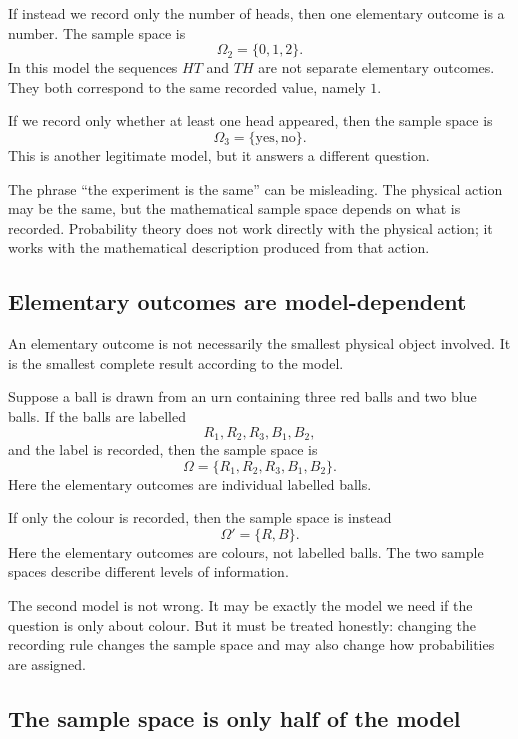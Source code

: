 If instead we record only the number of heads, then one elementary outcome is a
number. The sample space is
\[
\Omega_2=\{0,1,2\}.
\]
In this model the sequences \(HT\) and \(TH\) are not separate elementary
outcomes. They both correspond to the same recorded value, namely \(1\).

If we record only whether at least one head appeared, then the sample space is
\[
\Omega_3=\{\text{yes},\text{no}\}.
\]
This is another legitimate model, but it answers a different question.

\begin{remarkbox}
The phrase ``the experiment is the same'' can be misleading. The physical action
may be the same, but the mathematical sample space depends on what is recorded.
Probability theory does not work directly with the physical action; it works
with the mathematical description produced from that action.
\end{remarkbox}

\subsection*{Elementary outcomes are model-dependent}

An elementary outcome is not necessarily the smallest physical object involved.
It is the smallest complete result according to the model.

\begin{examplebox}
Suppose a ball is drawn from an urn containing three red balls and two blue
balls. If the balls are labelled
\[
R_1,R_2,R_3,B_1,B_2,
\]
and the label is recorded, then the sample space is
\[
\Omega=\{R_1,R_2,R_3,B_1,B_2\}.
\]
Here the elementary outcomes are individual labelled balls.

If only the colour is recorded, then the sample space is instead
\[
\Omega'=\{R,B\}.
\]
Here the elementary outcomes are colours, not labelled balls. The two sample
spaces describe different levels of information.
\end{examplebox}

The second model is not wrong. It may be exactly the model we need if the
question is only about colour. But it must be treated honestly: changing the
recording rule changes the sample space and may also change how probabilities
are assigned.

\subsection*{The sample space is only half of the model}

